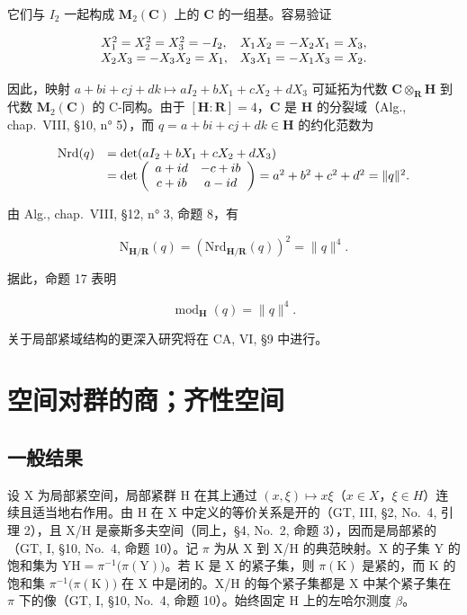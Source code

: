 它们与 \(I_2\) 一起构成 \(\mathbf{M}_2(\mathbf{C})\) 上的 \(\mathbf{C}\) 的一组基。容易验证

\[
\begin{array}{l l} {X _ {1} ^ {2} = X _ {2} ^ {2} = X _ {3} ^ {2} = - I _ {2},} & {X _ {1} X _ {2} = - X _ {2} X _ {1} = X _ {3},} \\ {X _ {2} X _ {3} = - X _ {3} X _ {2} = X _ {1},} & {X _ {3} X _ {1} = - X _ {1} X _ {3} = X _ {2}.} \end{array}
\]

因此，映射 \(a + bi + cj + dk \mapsto aI_2 + bX_1 + cX_2 + dX_3\) 可延拓为代数 \(\mathbf{C} \otimes_{\mathbf{R}} \mathbf{H}\) 到代数 \(\mathbf{M}_2(\mathbf{C})\) 的 C-同构。由于 \([\mathbf{H} : \mathbf{R}] = 4\)，\(\mathbf{C}\) 是 \(\mathbf{H}\) 的分裂域（Alg., chap.~VIII, §10, n° 5），而 \(q = a + bi + cj + dk \in \mathbf{H}\) 的约化范数为

\[
\begin{array}{r l} \mathrm{Nrd} (q) & = \det (a I _ {2} + b X _ {1} + c X _ {2} + d X _ {3}) \\ & = \det \left( \begin{array}{c c} a + i d & - c + i b \\ c + i b & a - i d \end{array} \right) = a ^ {2} + b ^ {2} + c ^ {2} + d ^ {2} = \| q \| ^ {2}. \end{array}
\]

由 Alg., chap.~VIII, §12, n° 3, 命题 8，有

\[
\mathrm{N} _ {\mathbf {H} / \mathbf {R}} (q) = \left(\mathrm{Nrd} _ {\mathbf {H} / \mathbf {R}} (q)\right) ^ {2} = \| q \| ^ {4}.
\]

据此，命题 17 表明

\[
\operatorname{mod} _ {\mathbf {H}} (q) = \| q \| ^ {4}.
\]

关于局部紧域结构的更深入研究将在 CA, VI, §9 中进行。

\section{空间对群的商；齐性空间}

\subsection{一般结果}

设 X 为局部紧空间，局部紧群 H 在其上通过 \((x,\xi)\mapsto x\xi\)（\(x\in X\)，\(\xi\in H\)）连续且适当地右作用。由 H 在 X 中定义的等价关系是开的（GT, III, §2, No.~4, 引理 2），且 X/H 是豪斯多夫空间（同上，§4, No.~2, 命题 3），因而是局部紧的（GT, I, §10, No.~4, 命题 10）。记 \(\pi\) 为从 X 到 X/H 的典范映射。X 的子集 Y 的饱和集为 \(\mathrm{YH}=\pi^{-1}\big(\pi(\mathrm{Y})\big)\)。若 K 是 X 的紧子集，则 \(\pi(\mathrm{K})\) 是紧的，而 K 的饱和集 \(\pi^{-1}\big(\pi(\mathrm{K})\big)\) 在 X 中是闭的。X/H 的每个紧子集都是 X 中某个紧子集在 \(\pi\) 下的像（GT, I, §10, No.~4, 命题 10）。始终固定 H 上的左哈尔测度 \(\beta\)。

